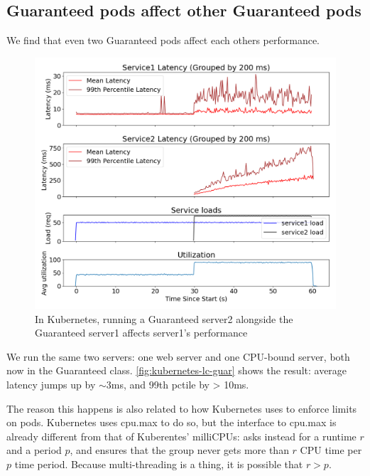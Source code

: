 \subsection{Guaranteed pods affect other Guaranteed pods}

We find that even two Guaranteed pods affect each others performance. 

\begin{figure}[t]
    \centering
    \includegraphics[width=\columnwidth]{graphs/kubernetes-lc-guar.png}
    \caption{In Kubernetes, running a Guaranteed server2 alongside the
    Guaranteed server1 affects server1's
    performance}\label{fig:kubernetes-lc-guar}
\end{figure}

We run the same two servers: one web server and one CPU-bound server, both now
in the Guaranteed class. \autoref{fig:kubernetes-lc-guar} shows the result:
average latency jumps up by $\sim$3ms, and 99th pctile by > 10ms.


The reason this happens is also related to how Kubernetes uses \cgroups{} to
enforce limits on pods. Kubernetes uses cpu.max to do so, but the interface to
\cgroups{} cpu.max is already different from that of Kuberentes' milliCPUs:
\cgroups{} asks instead for a runtime $r$ and a period $p$, and ensures that the
group never gets more than $r$ CPU time per $p$ time period. Because
multi-threading is a thing, it is possible that $r>p$. 

